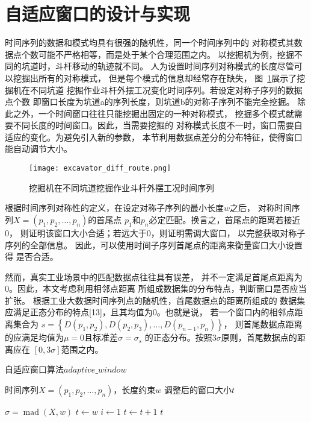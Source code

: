 \section{自适应窗口的设计与实现}
时间序列的数据和模式均具有很强的随机性，同一个时间序列中的
对称模式其数据点个数可能不严格相等，而是处于某个合理范围之内。
以挖掘机为例，挖掘不同的坑道时，斗杆移动的轨迹就不同。
人为设置时间序列对称模式的长度尽管可以挖掘出所有的对称模式，
但是每个模式的信息却经常存在缺失，
图~\ref{fig:excavator_diff_route}展示了挖掘机在不同坑道
挖掘作业斗杆外摆工况变化时间序列。若设定对称子序列的数据点个数
即窗口长度为坑道a的序列长度，则坑道b的对称子序列不能完全挖掘。
除此之外，一个时间窗口往往只能挖掘出固定的一种对称模式，
挖掘多个模式就需要不同长度的时间窗口。因此，当需要挖掘的
对称模式长度不一时，窗口需要自适应的变化。为避免引入新的参数，
本节利用数据点差分的分布特征，使得窗口能自动调节大小。
\begin{figure}
  \centering
  \texttt{[image: excavator\_diff\_route.png]}
  \caption{挖掘机在不同坑道挖掘作业斗杆外摆工况时间序列}
  \label{fig:excavator_diff_route}
\end{figure}

根据时间序列对称性的定义，在设定对称子序列的最小长度$w$之后，
对称时间序列$X=\left(p_1,p_2,…,p_n \right)$的首尾点
$p_1$和$p_n$必定匹配。换言之，首尾点的距离若接近0，
则证明该窗口大小合适；若远大于0，则证明需调大窗口，
以完整获取对称子序列的全部信息。
因此，可以使用时间子序列首尾点的距离来衡量窗口大小设置得
是否合适。

然而，真实工业场景中的匹配数据点往往具有误差，
并不一定满足首尾点距离为0。因此，本文考虑利用相邻点距离
所组成数据集的分布特点，判断窗口是否应当扩张。
根据工业大数据时间序列点的随机性，首尾数据点的距离所组成的
数据集应满足正态分布的特点[13]，且其均值为0。也就是说，
若一个窗口内的相邻点距离集合为
$s=\left\{D\left(p_{1}, p_{2}\right), D\left(p_{2}, p_{3}\right), \ldots, D\left(p_{n-1}, p_{n}\right)\right\}$，
则首尾数据点距离的应满足均值为$\mu=0$且标准差$\sigma=\sigma_s$
的正态分布。按照3$\sigma$原则，首尾数据点的距离应在
$\left[0,3\sigma\right]$范围之内。

\renewcommand{\algorithmicrequire}{\textbf{输入：}\unskip}
\renewcommand{\algorithmicensure}{\textbf{输出：}\unskip}

\begin{algorithm}
  \caption{自适应窗口算法$adaptive\_window$}
  \label{alg:adaptive_window}
  \small
  \begin{algorithmic}
    \REQUIRE 时间序列$X=\left(p_1,p_2,…,p_n\right)$，长度约束$w$
    \ENSURE 调整后的窗口大小$t$

    \STATE $\sigma=\operatorname{mad}(X, w)$
    \STATE $t \leftarrow w$
    \STATE $i \leftarrow 1$
      \STATE $t \leftarrow t+1$
    \ENDWHILE
    \RETURN $t$
  \end{algorithmic}
\end{algorithm}

